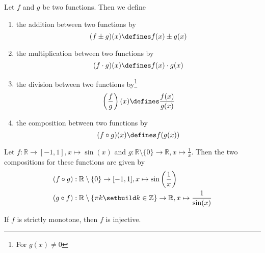 \begin{definition}\label{def-function-operations}
    Let $f$ and $g$ be two functions. Then we define
    \begin{enumerate}
        \item the addition between two functions by
        \begin{equation}
            (f \pm g)(x) \defines f(x) \pm g(x)
        \end{equation}
        \item the multiplication between two functions by
        \begin{equation}
            (f \cdot g)(x) \defines f(x) \cdot g(x)
        \end{equation}
        \item the division between two functions by\footnote{For $g(x)\neq0$}
        \begin{equation}
            \left(\frac{f}{g}\right)(x) \defines \frac{f(x)}{g(x)} 
        \end{equation}
        \item the composition between two functions by
        \begin{equation}
            (f \circ g)(x) \defines f(g(x))
        \end{equation}
    \end{enumerate}
\end{definition}

\begin{exm}
    Let $f:\mathbb{R}\to[-1,1],x\mapsto\sin(x)$ and $g:\mathbb{R}\setminus\{0\}\to\mathbb{R},x\mapsto\tfrac{1}{x}$.
    Then the two compositions for these functions are given by
    \begin{align*}
        &(f \circ g):\mathbb{R}\setminus\{0\}\to[-1,1],x\mapsto\sin\left(\frac{1}{x}\right)\\
        &(g \circ f):\mathbb{R}\setminus\left\{\pi k\setbuild k\in\mathbb{Z}\right\}\to\mathbb{R},x\mapsto\frac{1}{\sin(x)}
    \end{align*}
\end{exm}

\begin{rem}\label{rem-monotone-implies-injective}
    If $f$ is strictly monotone, then $f$ is injective.
\end{rem}

